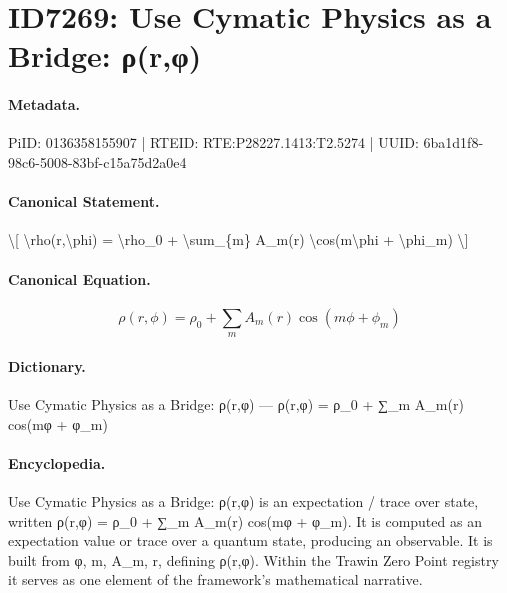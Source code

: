 \section*{ID7269: Use Cymatic Physics as a Bridge: ρ(r,φ)}
\paragraph{Metadata.}
PiID: 0136358155907 | RTEID: RTE:P28227.1413:T2.5274 | UUID: 6ba1d1f8-98c6-5008-83bf-c15a75d2a0e4

\paragraph{Canonical Statement.}
\textbackslash{}[ \textbackslash{}rho(r,\textbackslash{}phi) = \textbackslash{}rho\_0 + \textbackslash{}sum\_\{m\} A\_m(r) \textbackslash{}cos(m\textbackslash{}phi + \textbackslash{}phi\_m) \textbackslash{}]

\paragraph{Canonical Equation.}
\[
\rho(r,\phi) = \rho_0 + \sum_{m} A_m(r) \cos(m\phi + \phi_m)
\]

\paragraph{Dictionary.}
Use Cymatic Physics as a Bridge: ρ(r,φ) — ρ(r,φ) = ρ\_0 + ∑\_m A\_m(r) cos(mφ + φ\_m)

\paragraph{Encyclopedia.}
Use Cymatic Physics as a Bridge: ρ(r,φ) is an expectation / trace over state, written ρ(r,φ) = ρ\_0 + ∑\_m A\_m(r) cos(mφ + φ\_m). It is computed as an expectation value or trace over a quantum state, producing an observable. It is built from φ, m, A\_m, r, defining ρ(r,φ). Within the Trawin Zero Point registry it serves as one element of the framework's mathematical narrative.

